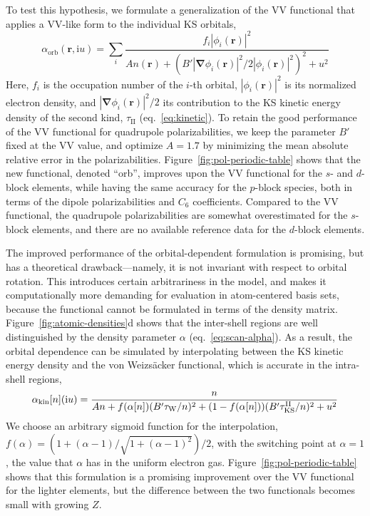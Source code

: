 To test this hypothesis, we formulate a generalization of the VV functional that applies a VV-like form to the individual KS orbitals,
\begin{equation}
  \alpha_\text{orb}(\mathbf r,\mathrm iu)=\sum_i\frac{f_i|\phi_i(\mathbf r)|^2}{An(\mathbf r)+(B'|\boldsymbol\nabla\phi_i(\mathbf r)|^2/2|\phi_i(\mathbf r)|^2)^2+u^2}
\end{equation}
Here, $f_i$ is the occupation number of the $i$-th orbital, $|\phi_i(\mathbf r)|^2$ is its normalized electron density, and $|\boldsymbol\nabla\phi_i(\mathbf r)|^2/2$ its contribution to the KS kinetic energy density of the second kind, $\tau_\text{II}$ (eq.~\ref{eq:kinetic}).
To retain the good performance of the VV functional for quadrupole polarizabilities, we keep the parameter $B'$ fixed at the VV value, and optimize $A=1.7$ by minimizing the mean absolute relative error in the polarizabilities.
Figure~\ref{fig:pol-periodic-table} shows that the new functional, denoted ``orb'', improves upon the VV functional for the $s$- and $d$-block elements, while having the same accuracy for the $p$-block species, both in terms of the dipole polarizabilities and $C_6$ coefficients.
Compared to the VV functional, the quadrupole polarizabilities are somewhat overestimated for the $s$-block elements, and there are no available reference data for the $d$-block elements.

The improved performance of the orbital-dependent formulation is promising, but has a theoretical drawback---namely, it is not invariant with respect to orbital rotation.
This introduces certain arbitrariness in the model, and makes it computationally more demanding for evaluation in atom-centered basis sets, because the functional cannot be formulated in terms of the density matrix.
Figure~\ref{fig:atomic-densities}d shows that the inter-shell regions are well distinguished by the density parameter $\alpha$ (eq.~\eqref{eq:scan-alpha}).
As a result, the orbital dependence can be simulated by interpolating between the KS kinetic energy density and the von Weizsäcker functional, which is accurate in the intra-shell regions,
\begin{equation}
  \alpha_\text{kin}[n](\mathrm iu)=\frac{n}{An+f(\alpha[n])(B'\tau_\text W/n)^2+(1-f(\alpha[n]))(B'\tau_\text{KS}^\text{II}/n)^2+u^2}
\end{equation}
We choose an arbitrary sigmoid function for the interpolation, $f(\alpha)=(1+(\alpha-1)/\sqrt{1+(\alpha-1)^2})/2$, with the switching point at $\alpha=1$, the value that $\alpha$ has in the uniform electron gas.
Figure~\ref{fig:pol-periodic-table} shows that this formulation is a promising improvement over the VV functional for the lighter elements, but the difference between the two functionals becomes small with growing $Z$.

